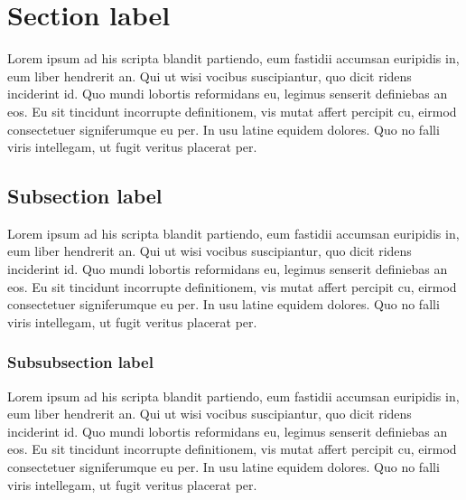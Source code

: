 \documentclass[10pt, english, pdftex]{template/template}
\author{Aitor Alonso Núñez}         %
\begin{document}
\titleMain

{\hypersetup{linkcolor=black}   %
\tableofcontents\newpage        %
}

\section{Section label}
Lorem ipsum ad his scripta blandit partiendo, eum fastidii accumsan euripidis in, eum liber hendrerit an. Qui ut wisi vocibus suscipiantur,
quo dicit ridens inciderint id. Quo mundi lobortis reformidans eu, legimus senserit definiebas an eos. Eu sit tincidunt incorrupte definitionem,
vis mutat affert percipit cu, eirmod consectetuer signiferumque eu per. In usu latine equidem dolores. Quo no falli viris intellegam, ut fugit
veritus placerat per.

\subsection{Subsection label}
Lorem ipsum ad his scripta blandit partiendo, eum fastidii accumsan euripidis in, eum liber hendrerit an. Qui ut wisi vocibus suscipiantur,
quo dicit ridens inciderint id. Quo mundi lobortis reformidans eu, legimus senserit definiebas an eos. Eu sit tincidunt incorrupte definitionem,
vis mutat affert percipit cu, eirmod consectetuer signiferumque eu per. In usu latine equidem dolores. Quo no falli viris intellegam, ut fugit
veritus placerat per.

\subsubsection{Subsubsection label}\label{subsubsection_label}
Lorem ipsum ad his scripta blandit partiendo, eum fastidii accumsan euripidis in, eum liber hendrerit an. Qui ut wisi vocibus suscipiantur,
quo dicit ridens inciderint id. Quo mundi lobortis reformidans eu, legimus senserit definiebas an eos. Eu sit tincidunt incorrupte definitionem,
vis mutat affert percipit cu, eirmod consectetuer signiferumque eu per. In usu latine equidem dolores. Quo no falli viris intellegam, ut fugit
veritus placerat per.
\end{document}
